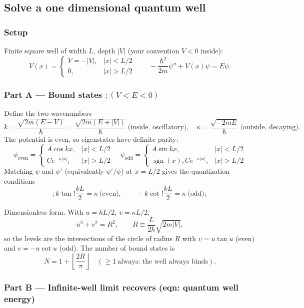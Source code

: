 \documentclass[twoside]{article}
\numberwithin{equation}{section}
\begin{document}
\subsection{Solve a one dimensional quantum well}

\subsubsection{Setup}

Finite square well of width $L$, depth $|V|$ (your convention $V<0$ inside):
$$V(x)=\begin{cases} V=-|V|, &|x|<L/2 \\ 0, &|x|>L/2\end{cases}\qquad -\frac{\hbar^2}{2m}\psi''+V(x)\psi=E\psi .$$

\subsubsection{Part A — Bound states $;(V<E<0)$}

Define the two wavenumbers
$$k=\frac{\sqrt{2m(E-V)}}{\hbar}=\frac{\sqrt{2m(E+|V|)}}{\hbar}\ \text{(inside, oscillatory)},\quad \kappa=\frac{\sqrt{-2mE}}{\hbar}\ \text{(outside, decaying)} .$$
The potential is even, so eigenstates have definite parity:
$$\psi_{\text{even}}=\begin{cases} A\cos kx, &|x|<L/2\\ Ce^{-\kappa|x|}, &|x|>L/2\end{cases}\quad 
    \psi_{\text{odd}}=\begin{cases}A\sin kx, &|x|<L/2\\ \operatorname{sgn}(x),Ce^{-\kappa|x|}, &|x|>L/2\end{cases}$$
Matching $\psi$ and $\psi'$ (equivalently $\psi'/\psi$) at $x=L/2$ gives the quantization conditions
$$\boxed{;k\tan!\frac{kL}{2}=\kappa\ \text{(even)},\qquad -k\cot!\frac{kL}{2}=\kappa\ \text{(odd)};}$$

Dimensionless form. With $u=kL/2,\ v=\kappa L/2$,
$$u^2+v^2=R^2,\qquad R\equiv\frac{L}{2\hbar}\sqrt{2m|V|},$$
so the levels are the intersections of the circle of radius $R$ with $v=u\tan u$ (even) and $v=-u\cot u$ (odd). The number of bound states is
$$N=1+\left\lfloor \frac{2R}{\pi}\right\rfloor\quad(\ge1\ \text{always: the well always binds}).$$

\subsubsection{Part B — Infinite-well limit recovers (eqn: quantum well energy)}
\end{document}
